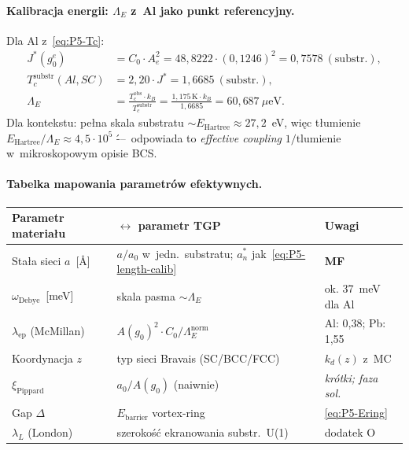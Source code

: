 \paragraph{Kalibracja energii: $\Lambda_E$ z~Al jako punkt referencyjny.}
Dla Al z~\eqref{eq:P5-Tc}:
\begin{align*}
  J^*(g_0^e) &= C_0 \cdot A_e^2 = 48{,}8222 \cdot (0{,}1246)^2 = 0{,}7578\ (\text{substr.}),\\
  T_c^\text{substr}(Al,SC) &= 2{,}20 \cdot J^* = 1{,}6685\ (\text{substr.}),\\
  \Lambda_E &= \frac{T_c^\text{obs}\cdot k_B}{T_c^\text{substr}}
             = \frac{1{,}175\,\text{K}\cdot k_B}{1{,}6685} = 60{,}687\ \mu\text{eV}.
\end{align*}
Dla kontekstu: pełna skala substratu $\sim E_\text{Hartree}\approx 27{,}2$~eV,
wi\k{e}c t\l{}umienie $E_\text{Hartree}/\Lambda_E \approx 4{,}5\cdot10^5$
\'---\ odpowiada to \emph{effective coupling} $1/\text{tlumienie}$
w~mikroskopowym opisie BCS.

\paragraph{Tabelka mapowania parametr\'ow efektywnych.}
\begin{center}\small
\begin{tabular}{@{}lll@{}}
\toprule
\textbf{Parametr materia\l{}u} & \textbf{$\leftrightarrow$ parametr TGP} & \textbf{Uwagi} \\
\midrule
Sta\l{}a sieci $a$~[\AA]        & $a/a_0$ w~jedn.~substratu; $a^*_n$ jak~\eqref{eq:P5-length-calib} & \textbf{MF} \\
$\omega_\text{Debye}$~[meV]    & skala pasma $\sim \Lambda_E$                & ok. 37~meV dla Al \\
$\lambda_\text{ep}$ (McMillan) & $A(g_0)^2 \cdot C_0 / \Lambda_E^\text{norm}$ & Al: 0{,}38; Pb: 1{,}55 \\
Koordynacja $z$                 & typ sieci Bravais (SC/BCC/FCC)              & $k_d(z)$ z~MC \\
$\xi_\text{Pippard}$             & $a_0 / A(g_0)$ (naiwnie)                    & \emph{krótki; faza sol.} \\
Gap $\Delta$                    & $E_\text{barrier}$ vortex-ring               & \eqref{eq:P5-Ering} \\
$\lambda_L$ (London)             & szeroko\'s\'c ekranowania substr.~U(1)      & dodatek O \\
\bottomrule
\end{tabular}
\end{center}

